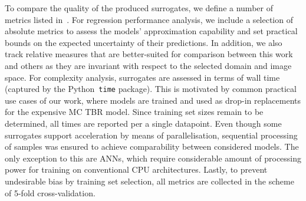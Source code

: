 To compare the quality of the produced surrogates, we define a number of metrics listed
in~. For regression performance analysis, we include a
selection of absolute metrics to assess the models' approximation capability and set
practical bounds on the expected uncertainty of their predictions. In addition, we also track
relative measures that are better-suited for comparison between this work and others as
they are invariant with respect to the selected domain and image space.
For complexity analysis, surrogates are assessed in terms of wall
time (captured by the Python~\texttt{time} package). This is motivated by common practical use
cases of our work, where models are trained and used as drop-in replacements for the
expensive MC TBR model. Since training set sizes remain to be determined, all times are
reported per a single datapoint. Even though some surrogates support acceleration
by means of parallelisation, sequential processing of samples was ensured to
achieve comparability between considered models. The only exception to this are
ANNs, which require considerable amount of processing power for training on
conventional CPU architectures. Lastly, to prevent undesirable bias by training set
selection, all metrics are collected in the scheme of 5-fold cross-validation.

